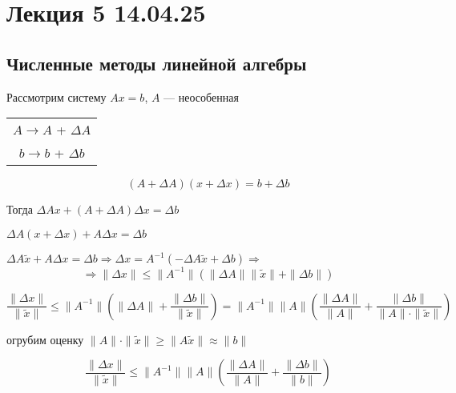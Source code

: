 \def\letus{%
    \mathord{\setbox0=\hbox{$\exists$}%
             \hbox{\kern 0.125\wd0%
                   \vbox to \ht0{%
                      \hrule width 0.75\wd0%
                      \vfill%
                      \hrule width 0.75\wd0}%
                   \vrule height \ht0%
                   \kern 0.125\wd0}%
           }%
}

\section{Лекция 5 14.04.25}
\subsection{Численные методы линейной алгебры}

Рассмотрим систему \( Ax = b \), \( A \) — неособенная

\begin{tabular}{c|}
     \(A \rightarrow A \) + \( \Delta A \)\\
     \(b \rightarrow b \) + \( \Delta b \)
\end{tabular}


\[(A + \Delta A)(x + \Delta x) =b + \Delta b\]

Тогда
\(\Delta A x + (A + \Delta A) \Delta x = \Delta b\)

\leftskip=1.2cm \(\Delta A (x + \Delta x) + A \Delta x = \Delta b\)

\leftskip=1.2cm \(\Delta A \tilde{x} + A \Delta x = \Delta b \Rightarrow \Delta x = A^{-1}(-\Delta A \tilde{x} + \Delta b) \Rightarrow\)
\[\Rightarrow \| \Delta x \| \leq \| A^{-1} \| (\| \Delta A \| \| \tilde{x} \| + \| \Delta b \|)\]

\[\frac{\| \Delta x \|}{\| \tilde{x} \|} \leq \| A^{-1} \| \left(\| \Delta A \| + \frac{\| \Delta b \|}{\| \tilde{x} \|}\right) = \| A^{-1} \| \| A \| \left(\frac{\| \Delta A \|}{\| A \|} + \frac{\| \Delta b \|}{\| A \| \cdot \| \tilde{x} \|}\right)\]

огрубим оценку \(\| A \| \cdot \| \tilde{x} \| \geq \| A \tilde{x} \| \approx \| b \|\)


\[\frac{\| \Delta x \|}{\| \tilde{x} \|} \leq \| A^{-1} \| \| A \| \left(\frac{\| \Delta A \|}{\| A \|} + \frac{\| \Delta b \|}{\| b \|}\right)\]


